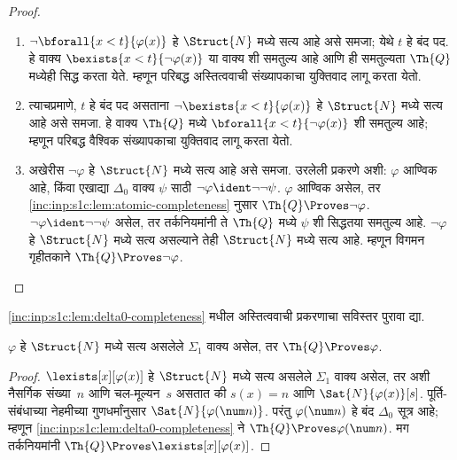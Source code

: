 \begin{proof}
\begin{enumerate}
\item $\lnot \bforall{x<t}{\varphi(x)}$ हे
$\Struct{N}$ मध्ये सत्य आहे असे समजा;
येथे $t$ हे बंद पद. हे वाक्य
$\bexists{x<t}{\lnot \varphi(x)}$ या वाक्य
शी समतुल्य आहे आणि ही समतुल्यता
$\Th{Q}$ मध्येही सिद्ध करता येते. म्हणून
परिबद्ध अस्तित्ववाची संख्यापकाचा युक्तिवाद
लागू करता येतो.

\item त्याचप्रमाणे, $t$ हे बंद पद असताना
$\lnot \bexists{x<t}{\varphi(x)}$ हे
$\Struct{N}$ मध्ये सत्य आहे असे समजा.
हे वाक्य $\Th{Q}$ मध्ये
$\bforall{x<t}{\lnot\varphi(x)}$ शी समतुल्य
आहे; म्हणून परिबद्ध वैश्विक संख्यापकाचा
युक्तिवाद लागू करता येतो.

\item अखेरीस $\lnot \varphi$ हे
$\Struct{N}$ मध्ये सत्य आहे असे समजा.
उरलेली प्रकरणे अशी: $\varphi$ आण्विक आहे,
किंवा एखाद्या $\Delta_0$ वाक्य $\psi$
साठी $\lnot \varphi \ident \lnot\lnot \psi$.
$\varphi$ आण्विक असेल, तर
\ref{inc:inp:s1c:lem:atomic-completeness} नुसार
$\Th{Q} \Proves \lnot \varphi$.
$\lnot \varphi \ident \lnot\lnot \psi$ असेल,
तर तर्कनियमांनी ते $\Th{Q}$ मध्ये
$\psi$ शी सिद्धतया समतुल्य आहे.
$\lnot \varphi$ हे $\Struct{N}$ मध्ये सत्य
असल्याने तेही $\Struct{N}$ मध्ये सत्य आहे.
म्हणून विगमन गृहीतकाने
$\Th{Q} \Proves \lnot \varphi$.
\end{enumerate}
\end{proof}

\begin{prob}
\ref{inc:inp:s1c:lem:delta0-completeness} मधील
अस्तित्ववाची प्रकरणाचा सविस्तर पुरावा द्या.
\end{prob}

\begin{thm}
\label{inc:inp:s1c:thm:sigma1-completeness}
$\varphi$ हे $\Struct{N}$ मध्ये सत्य असलेले
$\Sigma_1$ वाक्य असेल, तर
$\Th{Q} \Proves \varphi$.
\end{thm}

\begin{proof}
$\lexists[x][\varphi(x)]$ हे $\Struct{N}$ मध्ये
सत्य असलेले $\Sigma_1$ वाक्य असेल,
तर अशी नैसर्गिक संख्या~$n$ आणि चल-मूल्यन~$s$
असतात की $s(x) = n$ आणि
$\Sat{N}{\varphi(x)}[s]$.
पूर्ति-संबंधाच्या नेहमीच्या गुणधर्मांनुसार
$\Sat{N}{\varphi(\num n)}$.
परंतु $\varphi(\num n)$ हे बंद $\Delta_0$ सूत्र
आहे; म्हणून \ref{inc:inp:s1c:lem:delta0-completeness} ने
$\Th{Q} \Proves \varphi(\num n)$.
मग तर्कनियमांनी
$\Th{Q} \Proves \lexists[x][\varphi(x)]$.
\end{proof}



